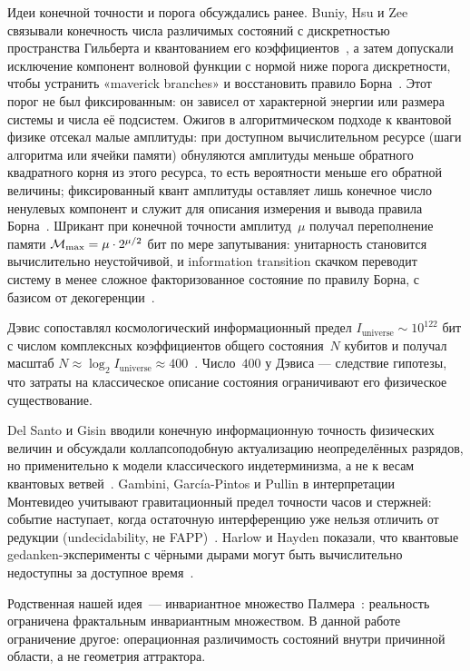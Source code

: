 \documentclass[11pt,a4paper]{article}
\begin{document}
Идеи конечной точности и порога обсуждались ранее. Buniy, Hsu и Zee связывали конечность числа различимых состояний с дискретностью пространства Гильберта и квантованием его коэффициентов~\cite{buniy2005}, а затем допускали исключение компонент волновой функции с нормой ниже порога дискретности, чтобы устранить «maverick branches» и восстановить правило Борна~\cite{buniy2006}. Этот порог не был фиксированным: он зависел от характерной энергии или размера системы и числа её подсистем. Ожигов в алгоритмическом подходе к квантовой физике отсекал малые амплитуды: при доступном вычислительном ресурсе (шаги алгоритма или ячейки памяти) обнуляются амплитуды меньше обратного квадратного корня из этого ресурса, то есть вероятности меньше его обратной величины; фиксированный квант амплитуды оставляет лишь конечное число ненулевых компонент и служит для описания измерения и вывода правила Борна~\cite{ozhigov2004}. Шрикант при конечной точности амплитуд~$\mu$ получал переполнение памяти ${\cal M}_{\max}=\mu\cdot 2^{\mu/2}$ бит по мере запутывания: унитарность становится вычислительно неустойчивой, и information transition скачком переводит систему в менее сложное факторизованное состояние по правилу Борна, с базисом от декогеренции~\cite{srikanth2003,srikanth2006}.

Дэвис сопоставлял космологический информационный предел $I_{\mathrm{universe}}\sim10^{122}$ бит с числом комплексных коэффициентов общего состояния~$N$ кубитов и получал масштаб $N\approx\log_2 I_{\mathrm{universe}}\approx400$~\cite{davies2007}. Число~$400$ у Дэвиса --- следствие гипотезы, что затраты на классическое описание состояния ограничивают его физическое существование.

Del Santo и Gisin вводили конечную информационную точность физических величин и обсуждали коллапсоподобную актуализацию неопределённых разрядов, но применительно к модели классического индетерминизма, а не к весам квантовых ветвей~\cite{delsanto2019}. Gambini, Garc\'ia-Pintos и Pullin в интерпретации Монтевидео учитывают гравитационный предел точности часов и стержней: событие наступает, когда остаточную интерференцию уже нельзя отличить от редукции (undecidability, не FAPP)~\cite{gambini2011}. Harlow и Hayden показали, что квантовые gedanken-эксперименты с чёрными дырами могут быть вычислительно недоступны за доступное время~\cite{harlow2013}.

Родственная нашей идея~--- инвариантное множество Палмера~\cite{palmer2009}: реальность ограничена фрактальным инвариантным множеством. В данной работе ограничение другое: операционная различимость состояний внутри причинной области, а не геометрия аттрактора.
\end{document}
